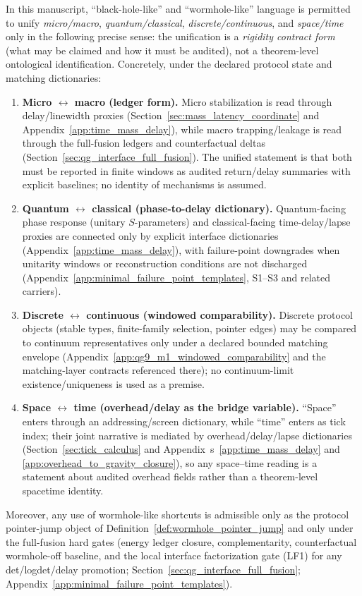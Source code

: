 \begin{proposition}
\label{prop:four_way_unification_contract_form}
\AuditTag In this manuscript, ``black-hole-like'' and ``wormhole-like'' language is permitted to unify
\emph{micro/macro}, \emph{quantum/classical}, \emph{discrete/continuous}, and \emph{space/time} only in the following precise sense:
the unification is a \emph{rigidity contract form} (what may be claimed and how it must be audited), not a theorem-level ontological identification.
Concretely, under the declared protocol state and matching dictionaries:
\begin{enumerate}
\item \textbf{Micro $\leftrightarrow$ macro (ledger form).}
Micro stabilization is read through delay/linewidth proxies (Section~\ref{sec:mass_latency_coordinate} and Appendix~\ref{app:time_mass_delay}),
while macro trapping/leakage is read through the full-fusion ledgers and counterfactual deltas (Section~\ref{sec:qg_interface_full_fusion}).
The unified statement is that both must be reported in finite windows as audited return/delay summaries with explicit baselines;
no identity of mechanisms is assumed.
\item \textbf{Quantum $\leftrightarrow$ classical (phase-to-delay dictionary).}
Quantum-facing phase response (unitary $S$-parameters) and classical-facing time-delay/lapse proxies are connected only by explicit interface dictionaries
(Appendix~\ref{app:time_mass_delay}), with failure-point downgrades when unitarity windows or reconstruction conditions are not discharged
(Appendix~\ref{app:minimal_failure_point_templates}, S1--S3 and related carriers).
\item \textbf{Discrete $\leftrightarrow$ continuous (windowed comparability).}
Discrete protocol objects (stable types, finite-family selection, pointer edges) may be compared to continuum representatives only under a declared bounded matching envelope
(Appendix~\ref{app:qg9_m1_windowed_comparability} and the matching-layer contracts referenced there);
no continuum-limit existence/uniqueness is used as a premise.
\item \textbf{Space $\leftrightarrow$ time (overhead/delay as the bridge variable).}
``Space'' enters through an addressing/screen dictionary, while ``time'' enters as tick index; their joint narrative is mediated by overhead/delay/lapse dictionaries
(Section~\ref{sec:tick_calculus} and Appendix~s~\ref{app:time_mass_delay} and \ref{app:overhead_to_gravity_closure}),
so any space--time reading is a statement about audited overhead fields rather than a theorem-level spacetime identity.
\end{enumerate}
Moreover, any use of wormhole-like shortcuts is admissible only as the protocol pointer-jump object of Definition~\ref{def:wormhole_pointer_jump} and only under the full-fusion hard gates
(energy ledger closure, complementarity, counterfactual wormhole-off baseline, and the local interface factorization gate (LF1) for any det/logdet/delay promotion;
Section~\ref{sec:qg_interface_full_fusion}; Appendix~\ref{app:minimal_failure_point_templates}).
\end{proposition}

